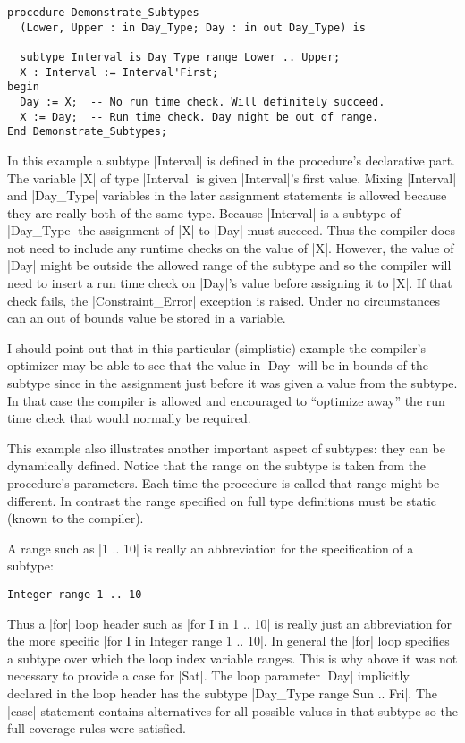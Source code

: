 \begin{lstlisting}
procedure Demonstrate_Subtypes
  (Lower, Upper : in Day_Type; Day : in out Day_Type) is

  subtype Interval is Day_Type range Lower .. Upper;
  X : Interval := Interval'First;
begin
  Day := X;  -- No run time check. Will definitely succeed.
  X := Day;  -- Run time check. Day might be out of range.
End Demonstrate_Subtypes;
\end{lstlisting}

In this example a subtype |Interval| is defined in the procedure's declarative part. The
variable |X| of type |Interval| is given |Interval|'s first value. Mixing |Interval| and
|Day_Type| variables in the later assignment statements is allowed because they are really both
of the same type. Because |Interval| is a subtype of |Day_Type| the assignment of |X| to |Day|
must succeed. Thus the compiler does not need to include any runtime checks on the value of |X|.
However, the value of |Day| might be outside the allowed range of the subtype and so the
compiler will need to insert a run time check on |Day|'s value before assigning it to |X|. If
that check fails, the |Constraint_Error| exception is raised. Under no circumstances can an out
of bounds value be stored in a variable.

I should point out that in this particular (simplistic) example the compiler's optimizer may be
able to see that the value in |Day| will be in bounds of the subtype since in the assignment
just before it was given a value from the subtype. In that case the compiler is allowed and
encouraged to ``optimize away'' the run time check that would normally be required.

This example also illustrates another important aspect of subtypes: they can be dynamically
defined. Notice that the range on the subtype is taken from the procedure's parameters. Each
time the procedure is called that range might be different. In contrast the range specified on
full type definitions must be static (known to the compiler).

A range such as |1 .. 10| is really an abbreviation for the specification of a subtype:

\begin{lstlisting}
Integer range 1 .. 10
\end{lstlisting}

\noindent Thus a |for| loop header such as |for I in 1 .. 10| is really just an abbreviation for
the more specific |for I in Integer range 1 .. 10|. In general the |for| loop specifies a
subtype over which the loop index variable ranges. This is why above it was not necessary to
provide a case for |Sat|. The loop parameter |Day| implicitly declared in the loop header has
the subtype |Day_Type range Sun .. Fri|. The |case| statement contains alternatives for all
possible values in that subtype so the full coverage rules were satisfied.

